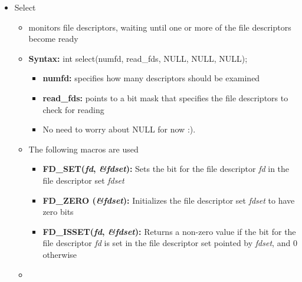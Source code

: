 \documentclass[12pt]{article}
\begin{document}
\bigskip

\begin{itemize}
    \item Select
    \begin{itemize}
        \item monitors file descriptors, waiting until one or more of the file
        descriptors become ready
        \item \textbf{Syntax:} int select(numfd, read\_fds, NULL, NULL, NULL);
        \begin{itemize}
            \item \textbf{numfd:} specifies how many descriptors should be examined
            \item \textbf{read\_fds:} points to a bit mask that specifies the file descriptors to check for reading
            \item No need to worry about NULL for now :).
        \end{itemize}
        \item The following macros are used
        \begin{itemize}
            \item \textbf{FD\_SET(\textit{fd}, \textit{\&fdset}):} Sets the bit for the file descriptor \textit{fd} in the file descriptor set \textit{fdset}
            \item \textbf{FD\_ZERO (\textit{\&fdset}):} Initializes the file descriptor set \textit{fdset} to have zero bits
            \item \textbf{FD\_ISSET(\textit{fd}, \textit{\&fdset}):} Returns a non-zero value if the bit for the file descriptor \textit{fd}
            is set in the file descriptor set pointed by \textit{fdset}, and 0 otherwise
        \end{itemize}
    \end{itemize}
    \begin{itemize}
        \item
    \end{itemize}
\end{itemize}
\end{document}
